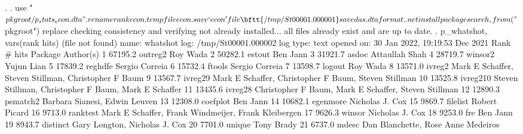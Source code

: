 . 
. use "$pkgroot/p_stats_econ.dta"
{\smallskip}
. rename rank econ
{\smallskip}
. tempfile econ
{\smallskip}
. save `econ'
file{\bftt{ /tmp/St00001.000001}} saved as .dta format
{\smallskip}
. 
. net install packagesearch, from("$pkgroot") replace
checking {} consistency and verifying not already installed...
all files already exist and are up to date.
{\smallskip}
. p_whatshot, vars(rank hits)
(file{} not found)
      name:  whatshot
       log:  /tmp/St00001.000002
  log type:  text
 opened on:  30 Jan 2022, 19:19:53
{\smallskip}
{}
{\smallskip}
        Dec 2021   
  Rank   \# hits    Package       Author(s)
     1  67195.2    outreg2       Roy Wada                                
     2  50282.1    estout        Ben Jann                                
     3  31921.7    asdoc         Attaullah Shah                          
     4  28719.7    winsor2       Yujun Lian                              
     5  17839.2    reghdfe       Sergio Correia                          
     6  15732.4    ftools        Sergio Correia                          
     7  13598.7    logout        Roy Wada                                
     8  13571.0    ivreg2        Mark E Schaffer, Steven Stillman,       
                                   Christopher F Baum                      
     9  13567.7    ivreg29       Mark E Schaffer, Christopher F Baum,    
                                   Steven Stillman                         
    10  13525.8    ivreg210      Steven Stillman, Christopher F Baum,    
                                   Mark E Schaffer                         
    11  13435.6    ivreg28       Christopher F Baum, Mark E Schaffer,    
                                   Steven Stillman                         
    12  12890.3    psmatch2      Barbara Sianesi, Edwin Leuven           
    13  12308.0    coefplot      Ben Jann                                
    14  10682.1    egenmore      Nicholas J. Cox                         
    15   9869.7    filelist      Robert Picard                           
    16   9713.0    ranktest      Mark E Schaffer, Frank Windmeijer,      
                                   Frank Kleibergen                        
    17   9626.3    winsor        Nicholas J. Cox                         
    18   9253.0    fre           Ben Jann                                
    19   8943.7    distinct      Gary Longton, Nicholas J. Cox           
    20   7701.0    unique        Tony Brady                              
    21   6737.0    mdesc         Dan Blanchette, Rose Anne Medeiros      
